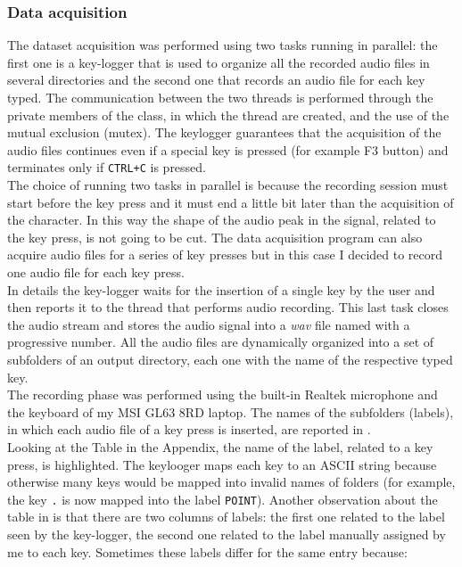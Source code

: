 \subsubsection{Data acquisition}
The dataset acquisition was performed using two tasks running in parallel: the first one is a key-logger that is used to organize all the recorded audio files in several directories and the second one that records an audio file for each key typed. The communication between the two threads is performed through the private members of the class, in which the thread are created, and the use of the mutual exclusion (mutex). The keylogger guarantees that the acquisition of the audio files continues even if a special key is pressed (for example F3 button) and terminates only if \texttt{CTRL+C} is pressed.\\
The choice of running two tasks in parallel is because the recording session must start before the key press and it must end a little bit later than the acquisition of the character. In this way the shape of the audio peak in the signal, related to the key press, is not going to be cut. The data acquisition program can also acquire audio files for a series of key presses but in this case I decided to record one audio file for each key press.\\
In details the key-logger waits for the insertion of a single key by the user and then reports it to the thread that performs audio recording. This last task closes the audio stream and stores the audio signal into a \textit{wav} file named with a progressive number. All the audio files are dynamically organized into a set of subfolders of an output directory, each one with the name of the respective typed key.\\
The recording phase was performed using the built-in Realtek microphone and the keyboard of my MSI GL63 8RD laptop. The names of the subfolders (labels), in which each audio file of a key press is inserted, are reported in .\\
Looking at the Table in the Appendix, the name of the label, related to a key press, is highlighted. The keylooger maps each key to an ASCII string because otherwise many keys would be mapped into invalid names of folders (for example, the key \texttt{.} is now mapped into the label \texttt{POINT}). Another observation about the table in  is that there are two columns of labels: the first one related to the label seen by the key-logger, the second one related to the label manually assigned by me to each key. Sometimes these labels differ for the same entry because:
